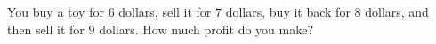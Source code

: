 You buy a toy for $6$ dollars, sell it for $7$ dollars, buy it back for $8$ dollars, and then sell it for $9$ dollars. How much profit do you make?
